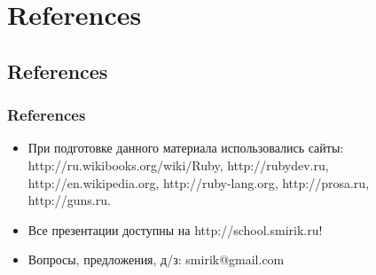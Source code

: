 \documentclass[compress,red]{beamer}
\begin{document}
\section{References}
\subsection{References}
\begin{frame}[fragile]
  \frametitle{References}
  \begin{itemize}
    \item При подготовке данного материала использовались сайты: http://ru.wikibooks.org/wiki/Ruby, http://rubydev.ru, http://en.wikipedia.org, http://ruby-lang.org, http://prosa.ru, http://guns.ru.
    \item Все презентации доступны на http://school.smirik.ru!
    \item Вопросы, предложения, д/з: smirik@gmail.com
  \end{itemize}
\end{frame}
\end{document}
